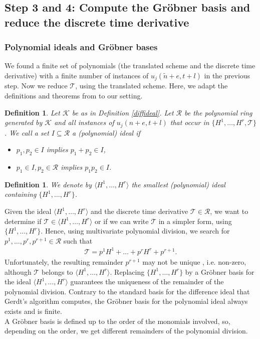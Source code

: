 \documentclass[sigconf,twocolumn]{acmart}
\newcommand{\1}{{\chi}}
\numberwithin{equation}{section}
\theoremstyle{thmlemcorr}
\numberwithin{theorem}{section}
\theoremstyle{thmlemcorr*}
\theoremstyle{defi}
\newtheorem{definition}[theorem]{Definition}
\theoremstyle{remexample}
\theoremstyle{ass}
\begin{document}
\subsection*{Step 3 and 4: Compute the Gr{\"o}bner basis and reduce the discrete time derivative}
	\subsubsection*{Polynomial ideals and Gr{\"o}bner bases}\label{polid}
	We found a finite set of polynomials (the translated scheme and the discrete time derivative) with a finite number of instances of $u_j(\tilde{n}+e,t+l)$ in the previous step. Now we reduce $\mathcal{T}$, using the translated scheme. Here, we adapt the definitions and theorems from \cite{hibi13} to our setting.
	\begin{definition}
		Let $\mathcal{K}$ be as in Definition \ref{diffideal}. Let $\mathcal{R}$ be the polynomial ring generated by $\mathcal{K}$ and all instances of $u_j(n+e,t+l)$ that occur in $\{H^1,\ldots,H^r,\mathcal{T}\}$.
		We call a set $ I\subseteq \mathcal{R}$ a (polynomial) ideal if
		\begin{itemize}
			\item $p_1,p_2\in I$ implies $p_1+p_2\in I$,
			\item $p_1\in I,p_2\in\mathcal{R}$ implies $p_1p_2\in I$.
		\end{itemize}
	\end{definition}
	\begin{definition}
		We denote by $\langle H^1,\ldots,H^r\rangle$ the smallest (polynomial) ideal containing $\{H^1,\ldots,H^r\}$.
	\end{definition}
	Given the ideal $\langle H^1,\ldots,H^r\rangle$ and the discrete time derivative $\mathcal{T}\in\mathcal{R}$, we want to determine if $\mathcal{T}\in\langle H^1,\ldots,H^r\rangle$ or if we can write $\mathcal{T}$ in a simpler form, using $\{H^1,\ldots,H^r\}$.
	Hence, using multivariate polynomial division, we search for $p^1,\ldots,p^r,p^{r+1}\in\mathcal{R}$ such that
	\begin{gather*}
		\mathcal{T}=p^1H^1+\ldots+p^rH^r+p^{r+1}.
	\end{gather*}
	Unfortunately, the resulting remainder $p^{r+1}$ may not be unique \cite[page 14, Example 1.2.3]{hibi13}, i.e. non-zero, although $\mathcal{T}$ belongs to $\langle H^1,\ldots,H^r \rangle$. 
	Replacing $\{H^1,\ldots,H^r\}$ by a Gr{\"o}bner basis for the ideal $\langle H^1,\ldots,H^r \rangle$ guarantees the uniqueness of the remainder of the polynomial division. 
	Contrary to the standard basis for the difference ideal that Gerdt's algorithm computes, the Gr{\"o}bner basis for the polynomial ideal always exists and is finite.\\
	A Gr{\"o}bner basis is defined up to the order of the monomials involved, so, depending on the order, we get different remainders of the polynomial division.
\end{document}
